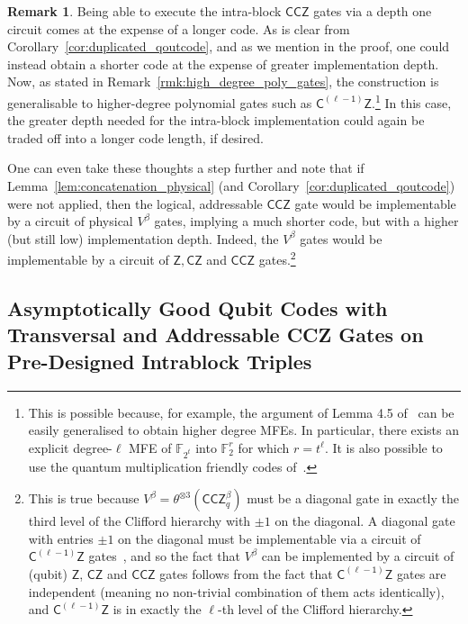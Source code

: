 \documentclass[11pt]{article}
\theoremstyle{definition}
\newtheorem{remark}[theorem]{Remark}
\newcommand{\CCZ}{\mathsf{CCZ}}
\newcommand{\CLZ}{\mathsf{C^{(\ell-1)}Z}}
\begin{document}
\begin{remark}
    Being able to execute the intra-block $\CCZ$ gates via a depth one circuit comes at the expense of a longer code. As is clear from Corollary~\ref{cor:duplicated_qoutcode}, and as we mention in the proof, one could instead obtain a shorter code at the expense of greater implementation depth. Now, as stated in Remark~\ref{rmk:high_degree_poly_gates}, the construction is generalisable to higher-degree polynomial gates such as $\CLZ$.\footnote{This is possible because, for example, the argument of Lemma 4.5 of~\cite{nguyen2024goodbinaryquantumcodes} can be easily generalised to obtain higher degree MFEs. In particular, there exists an explicit degree-$\ell$ MFE of $\mathbb{F}_{2^t}$ into $\mathbb{F}_2^r$ for which $r = t^\ell$. It is also possible to use the quantum multiplication friendly codes of~\cite{golowich2024asymptoticallygoodquantumcodes}.} In this case, the greater depth needed for the intra-block implementation could again be traded off into a longer code length, if desired.

    One can even take these thoughts a step further and note that if Lemma~\ref{lem:concatenation_physical} (and Corollary~\ref{cor:duplicated_qoutcode}) were not applied, then the logical, addressable $\CCZ$ gate would be implementable by a circuit of physical $V^\beta$ gates, implying a much shorter code, but with a higher (but still low) implementation depth. Indeed, the $V^\beta$ gates would be implementable by a circuit of $\mathsf{Z}, \mathsf{CZ}$ and $\CCZ$ gates.\footnote{This is true because $V^\beta = \theta^{\otimes 3}(\CCZ_q^\beta)$ must be a diagonal gate in exactly the third level of the Clifford hierarchy with $\pm 1$ on the diagonal. A diagonal gate with entries $\pm 1$ on the diagonal must be implementable via a circuit of $\CLZ$ gates~\cite{houshmand2014decomposition}, and so the fact that $V^\beta$ can be implemented by a circuit of (qubit) $\mathsf{Z}$, $\mathsf{CZ}$ and $\CCZ$ gates follows from the fact that $\CLZ$ gates are independent (meaning no non-trivial combination of them acts identically), and $\CLZ$ is in exactly the $\ell$-th level of the Clifford hierarchy.}
\end{remark}


\subsection{Asymptotically Good Qubit Codes with Transversal and Addressable CCZ Gates on \protect\linebreak Pre-Designed Intrablock Triples}
\end{document}
